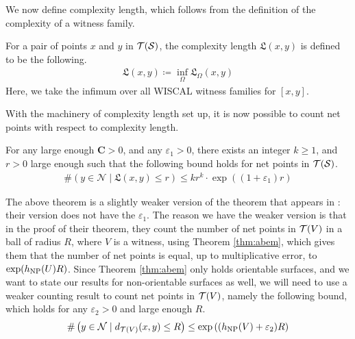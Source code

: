 \documentclass[12pt, reqno]{amsart}
\begin{document}
We now define complexity length, which follows from the definition of the complexity of a witness family.

\begin{definition}
  For a pair of points $x$ and $y$ in $\mathcal{T}(\mathcal{S})$, the complexity length $\mathfrak{L}(x,y)$ is defined to be the following.
  \begin{align*}
    \mathfrak{L}(x,y) \coloneqq \inf_{\Omega} \mathfrak{L}_{\Omega}(x,y)
  \end{align*}
  Here, we take the infimum over all WISCAL witness families for $[x,y]$.
\end{definition}

With the machinery of complexity length set up, it is now possible to count net points with respect to complexity length.

\begin{theorem}
  \label{thm:counting-with-complexity}
  For any large enough $\mathbf{C} > 0$, and any $\varepsilon_1 > 0$, there exists an integer $k \geq 1$, and $r > 0$ large enough such that the following bound holds for net points in $\mathcal{T}(\mathcal{S})$.
  \begin{align*}
    \# \left( y \in \mathcal{N} \mid \mathfrak{L}(x,y) \leq r \right) \leq kr^k \cdot \exp\left( (1+\varepsilon_1)r \right)
  \end{align*}
\end{theorem}

\begin{rem}
  The above theorem is a slightly weaker version of the theorem that appears in \textcite{dowdall2023lattice}: their version does not have the $\varepsilon_1$.
  The reason we have the weaker version is that in the proof of their theorem, they count the number of net points in $\mathcal{T}(V)$ in a ball of radius $R$, where $V$ is a witness, using Theorem \ref{thm:abem}, which gives them that the number of net points is equal, up to multiplicative error, to $\exp(h_{\mathrm{NP}}(U) R)$.
  Since Theorem \ref{thm:abem} only holds orientable surfaces, and we want to state our results for non-orientable surfaces as well, we will need to use a weaker counting result to count net points in $\mathcal{T}(V)$, namely the following bound, which holds for any $\varepsilon_2 > 0$ and large enough $R$.
  \begin{align*}
    \#\left( y \in \mathcal{N} \mid d_{\mathcal{T}(V)}(x, y) \leq R \right) \leq \exp\left( (h_{\mathrm{NP}}(V) + \varepsilon_2 ) R \right)
  \end{align*}
\end{rem}
\end{document}
